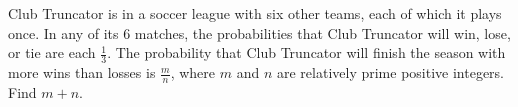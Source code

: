 Club Truncator is in a soccer league with six other teams, each of which it plays once. In any of its 6 matches, the probabilities that Club Truncator will win, lose, or tie are each $\frac{1}{3}$. The probability that Club Truncator will finish the season with more wins than losses is $\frac{m}{n}$, where $m$ and $n$ are relatively prime positive integers. Find $m+n$.